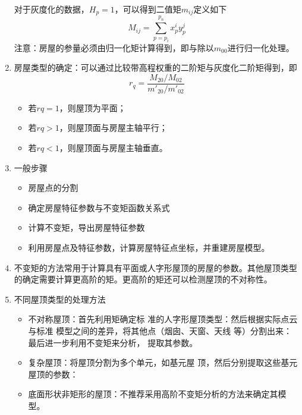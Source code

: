 \begin{enumerate}
		对于灰度化的数据，$ H_p = 1 $，可以得到二值矩$ m_{ij} $定义如下
		\begin{equation}
		M_{ij} = \sum_{p=p_i}^{p_n} x_p^i y_p^j
		\end{equation}
		注意：房屋的参量必须由归一化矩计算得到，即与除以$ m_{00} $进行归一化处理。
	\item 房屋类型的确定：可以通过比较带高程权重的二阶矩与灰度化二阶矩得到，即
		\begin{equation}
		r_q = \dfrac{M_{20}/M_{02}}{m'_{20}/m'_{02}}
		\end{equation}
		\begin{itemize}
			\item 若$ rq=1 $，则屋顶为平面；
			\item 若$ rq>1 $，则屋顶面与房屋主轴平行；
			\item 若$ rq<1 $，则屋顶面与房屋主轴垂直。
		\end{itemize}
	\item 一般步骤
		\begin{itemize}
			\item 房屋点的分割
			\item 确定房屋特征参数与不变矩函数关系式
			\item 计算不变矩，导出房屋特征参数
			\item 利用房屋点及特征参数，计算房屋特征点坐标，并重建房屋模型。
		\end{itemize}
	\item 不变矩的方法常用于计算具有平面或人字形屋顶的房屋的参数。其他屋顶类型的确定需要计算更高阶的矩。更高阶的矩还可以检测屋顶的不对称性。
	\item 不同屋顶类型的处理方法
		\begin{itemize}
			\item 不对称屋顶：首先利用矩确定标
				准的人字形屋顶类型：然后根据实际点云与标准
				模型之间的差异，将其他点（烟囱、天窗、天线
				等）分割出来：最后进一步利用不变矩来分析，
				提取其参数。
			\item 复杂屋顶：将屋顶分割为多个单元，如基元屋
				顶，然后分别提取这些基元屋顶的参数：
			\item 底面形状非矩形的屋顶：不推荐采用高阶不变矩分析的方法来确定其模型。
		\end{itemize}
\end{enumerate}

